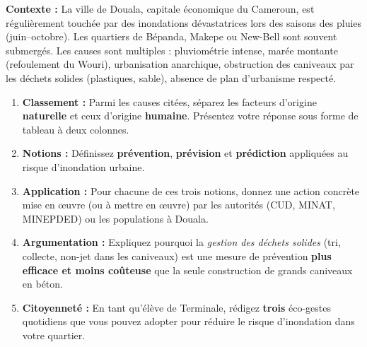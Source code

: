 \documentclass[11pt]{article}
\begin{document}
\begin{exercice}
\textbf{Contexte :} La ville de Douala, capitale économique du Cameroun, est régulièrement touchée par des inondations dévastatrices lors des saisons des pluies (juin--octobre). Les quartiers de Bépanda, Makepe ou New-Bell sont souvent submergés. Les causes sont multiples : pluviométrie intense, marée montante (refoulement du Wouri), urbanisation anarchique, obstruction des caniveaux par les déchets solides (plastiques, sable), absence de plan d'urbanisme respecté.

\begin{enumerate}
\item \textbf{Classement :} Parmi les causes citées, séparez les facteurs d'origine \textbf{naturelle} et ceux d'origine \textbf{humaine}. Présentez votre réponse sous forme de tableau à deux colonnes.
\item \textbf{Notions :} Définissez \textbf{prévention}, \textbf{prévision} et \textbf{prédiction} appliquées au risque d'inondation urbaine.
\item \textbf{Application :} Pour chacune de ces trois notions, donnez une action concrète mise en œuvre (ou à mettre en œuvre) par les autorités (CUD, MINAT, MINEPDED) ou les populations à Douala.
\item \textbf{Argumentation :} Expliquez pourquoi la \emph{gestion des déchets solides} (tri, collecte, non-jet dans les caniveaux) est une mesure de prévention \textbf{plus efficace et moins coûteuse} que la seule construction de grands caniveaux en béton.
\item \textbf{Citoyenneté :} En tant qu'élève de Terminale, rédigez \textbf{trois} éco-gestes quotidiens que vous pouvez adopter pour réduire le risque d'inondation dans votre quartier.
\end{enumerate}
\end{exercice}
\end{document}
